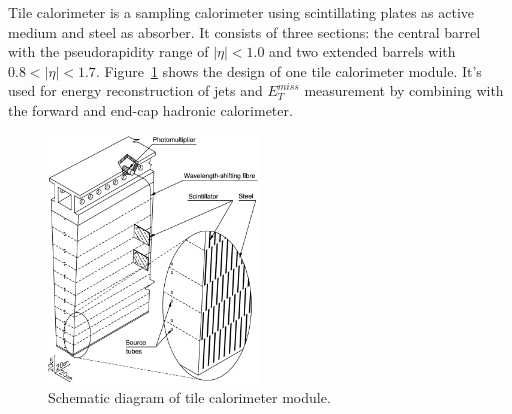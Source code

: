 Tile calorimeter is a sampling calorimeter using scintillating plates as active medium and steel as absorber.
It consists of three sections: the central barrel with the pseudorapidity range of $|\eta|<1.0$ and two extended barrels with $0.8 < |\eta| < 1.7$.
Figure~\ref{fig:calo_tile} shows the design of one tile calorimeter module.
It's used for energy reconstruction of jets and $E_{T}^{miss}$ measurement by combining with the forward and end-cap hadronic calorimeter.
\begin{figure}[!htb]
  \centering
  \includegraphics[width=0.5\textwidth]{figures/Detector/calo_tile.png}
  \caption{Schematic diagram of tile calorimeter module\cite{Aad:2010}.}
  \label{fig:calo_tile}
\end{figure}

